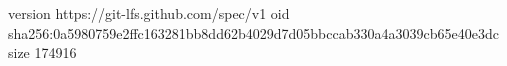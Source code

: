 version https://git-lfs.github.com/spec/v1
oid sha256:0a5980759e2ffc163281bb8dd62b4029d7d05bbccab330a4a3039cb65e40e3dc
size 174916
